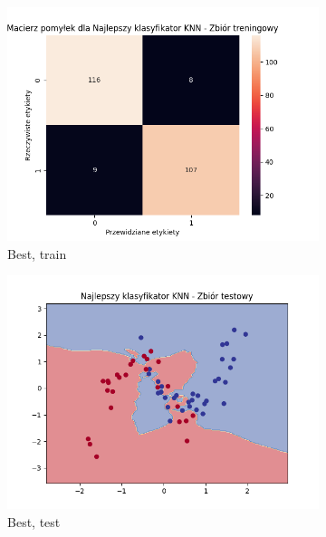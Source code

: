 \documentclass[12pt]{article}
\newcommand*{\subfigwidth}{0.15\textwidth}
\begin{document}
\begin{figure}[H]
\begin{subfigure}[t]{\subfigwidth}
        \includegraphics[width=\linewidth]{img/exp_2/knn/2_3/best/train_matrix.png}
        \caption{Best, train}
    \end{subfigure}
    \hfill
    \begin{subfigure}[t]{\subfigwidth}
        \includegraphics[width=\linewidth]{img/exp_2/knn/2_3/best/test_boundary.png}
        \caption{Best, test}
    \end{subfigure}
    \hfill
    \begin{subfigure}[t]{\subfigwidth}

\end{subfigure}
\end{figure}
\end{document}
